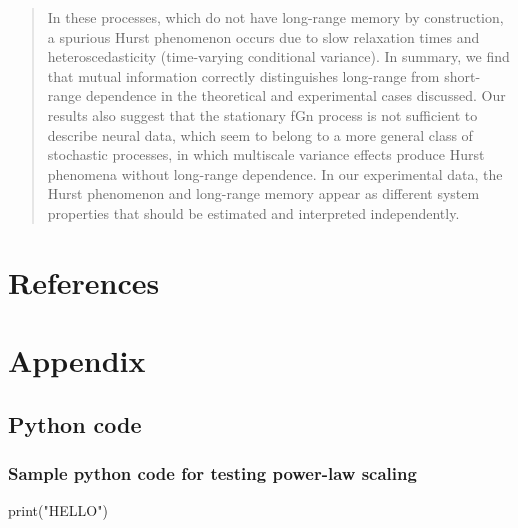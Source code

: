 \documentclass[
  sn-vancouver,
  Numbered,
  referee,
  lineno]{sn-jnl}
\newenvironment{Shaded}{\begin{snugshade}}{\end{snugshade}}
\newcommand{\BuiltInTok}[1]{\textcolor[rgb]{0.00,0.23,0.31}{#1}}
\newcommand{\NormalTok}[1]{\textcolor[rgb]{0.00,0.23,0.31}{#1}}
\newcommand{\StringTok}[1]{\textcolor[rgb]{0.13,0.47,0.30}{#1}}
\begin{document}
\begin{quote}
In these processes, which do not have long-range memory by construction,
a spurious Hurst phenomenon occurs due to slow relaxation times and
heteroscedasticity (time-varying conditional variance). In summary, we
find that mutual information correctly distinguishes long-range from
short-range dependence in the theoretical and experimental cases
discussed. Our results also suggest that the stationary fGn process is
not sufficient to describe neural data, which seem to belong to a more
general class of stochastic processes, in which multiscale variance
effects produce Hurst phenomena without long-range dependence. In our
experimental data, the Hurst phenomenon and long-range memory appear as
different system properties that should be estimated and interpreted
independently.
\end{quote}

\newpage{}

\section{References}\label{references}

\renewcommand{\bibsection}{}


\newpage{}

\section{Appendix}\label{appendix}

\subsection{Python code}\label{python-code}

\subsubsection{Sample python code for testing power-law
scaling}\label{sec-powerlawscalingcode}

\begin{Shaded}
\begin{Highlighting}[]
\BuiltInTok{print}\NormalTok{(}\StringTok{"HELLO"}\NormalTok{)}
\end{Highlighting}
\end{Shaded}
\end{document}
